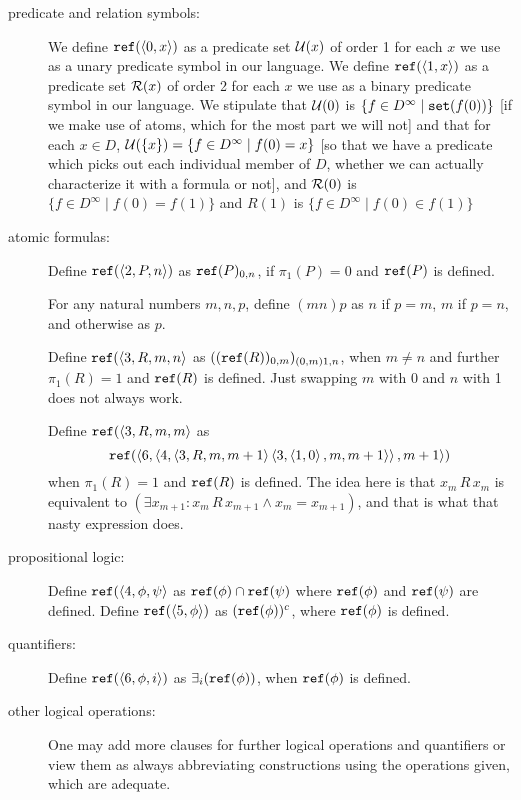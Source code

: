 \documentclass[12pt]{book}
\begin{document}
\begin{description}

\item[predicate and relation symbols:]  We define ${\tt ref}(\left<0,x\right>)$ as a predicate set ${\cal U}(x)$ of order 1 for each $x$ we use as a unary predicate symbol in our language.
We define ${\tt ref}(\left<1,x\right>)$ as a predicate set ${\cal R}(x)$ of order 2 for each $x$ we use as a binary predicate symbol in our language.  We stipulate that
${\cal U}(0)$ is $\{f \in D^{\infty} \mid {\tt set}(f(0))\}$ [if we make use of atoms, which for the most part we will not] and that for each $x \in D$, ${\cal U}(\{x\}) = \{f \in D^{\infty}\mid f(0)=x\}$ [so that we have a predicate which picks out each individual member of $D$, whether we can actually characterize it with a formula or not],   and ${\cal R}(0)$ is $\{f \in D^{\infty} \mid f(0)=f(1)\}$ and $R(1)$ is  $\{f \in D^{\infty} \mid f(0)\in f(1)\}$

\item[atomic formulas:]  

Define ${\tt ref}(\left<2,P,n\right>)$ as ${\tt ref}(P)_{0,n}$, if $\pi_1(P)=0$ and ${\tt ref}(P)$ is defined. 

For any natural numbers $m,n,p$, define $(mn)p$ as $n$ if $p=m$, $m$ if $p=n$, and otherwise as $p$.

 Define ${\tt ref}(\left<3,R,m,n\right>$ as $(({\tt ref}(R))_{0,m})_{(0,m)1,n}$, when $m\neq n$ and further $\pi_1(R)=1$ and ${\tt ref}(R)$ is defined.  Just swapping $m$ with 0 and $n$ with 1 does not always work.

Define ${\tt ref}(\left<3,R,m,m\right>$ as $${\tt ref}(\left<6,\left<4,\left<3,R,m,m+1\right>\left<3,\left<1,0\right>,m,m+1\right>\right>,m+1\right>)$$ when $\pi_1(R)=1$ and ${\tt ref}(R)$ is defined.  The idea here is that $x_m \, R \, x_m$ is equivalent to $(\exists x_{m+1} : x_m \,R\, x_{m+1} \wedge x_m = x_{m+1})$, and that is what that nasty expression does.

\item[propositional logic:]  Define ${\tt ref}(\left<4,\phi,\psi\right>$ as ${\tt ref}(\phi) \cap {\tt ref}(\psi)$ where ${\tt ref}(\phi)$ and ${\tt ref}(\psi)$ are defined.  Define ${\tt ref}(\left<5,\phi\right>)$ as $({\tt ref}(\phi))^c$, where ${\tt ref}(\phi)$ is defined.

\item[quantifiers:]   Define ${\tt ref}(\left<6,\phi,i\right>)$ as $\exists_i({\tt ref}(\phi))$, when ${\tt ref}(\phi)$ is defined.

\item[other logical operations:]  One may add more clauses for further logical operations and quantifiers or view them as always abbreviating constructions using the operations given, which are adequate.

\end{description}
\end{document}
